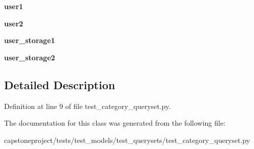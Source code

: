 \begin{DoxyCompactItemize}
{\bfseries user1}
\item 
\mbox{\label{classcapstoneproject_1_1tests_1_1test__models_1_1test__querysets_1_1test__category__queryset_1_1_category_query_set_test_class_a0c3b67e07e1d7d91ff3436becce85c5f}} 
{\bfseries user2}
\item 
\mbox{\label{classcapstoneproject_1_1tests_1_1test__models_1_1test__querysets_1_1test__category__queryset_1_1_category_query_set_test_class_a8818779474338bde0ab745dada078d8d}} 
{\bfseries user\+\_\+storage1}
\item 
\mbox{\label{classcapstoneproject_1_1tests_1_1test__models_1_1test__querysets_1_1test__category__queryset_1_1_category_query_set_test_class_a9baff411ad15a3ef558b0a0fe12ecd0b}} 
{\bfseries user\+\_\+storage2}
\end{DoxyCompactItemize}


\subsection{Detailed Description}


Definition at line 9 of file test\+\_\+category\+\_\+queryset.\+py.



The documentation for this class was generated from the following file\+:\begin{DoxyCompactItemize}
\item 
capstoneproject/tests/test\+\_\+models/test\+\_\+querysets/test\+\_\+category\+\_\+queryset.\+py\end{DoxyCompactItemize}
